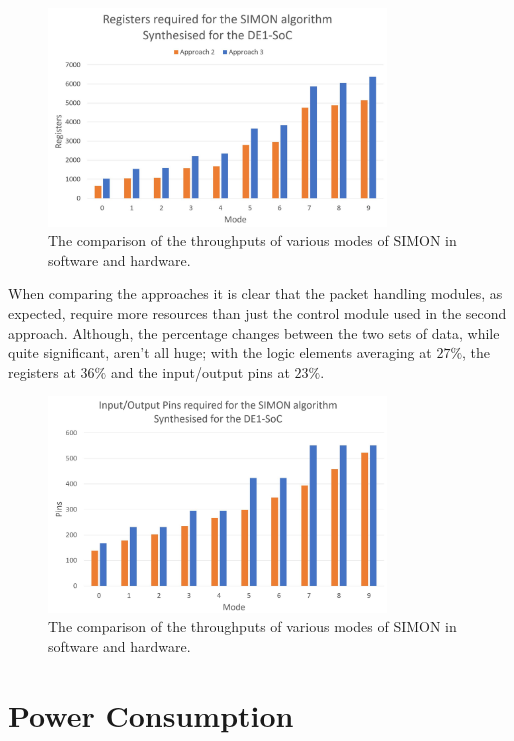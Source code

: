 \documentclass[12pt,twoside,a4paper]{report}
\begin{document}
	\begin{figure}[H]
		\includegraphics[width=0.8\textwidth]{SIMON_registers}
		\centering
		\caption{The comparison of the throughputs of various modes of SIMON in software and hardware.}
		\label{fig:registers}
	\end{figure}
	
	When comparing the approaches it is clear that the packet handling modules, as expected, require more resources than just the control module used in the second approach. Although, the percentage changes between the two sets of data, while quite significant, aren't all huge; with the logic elements averaging at $27\%$, the registers at $36\%$ and the input/output pins at $23\%$.
	
	\begin{figure}[H]
		\includegraphics[width=0.8\textwidth]{SIMON_pins}
		\centering
		\caption{The comparison of the throughputs of various modes of SIMON in software and hardware.}
		\label{fig:pins}
	\end{figure}
	
	\section{Power Consumption}
	
\end{document}

